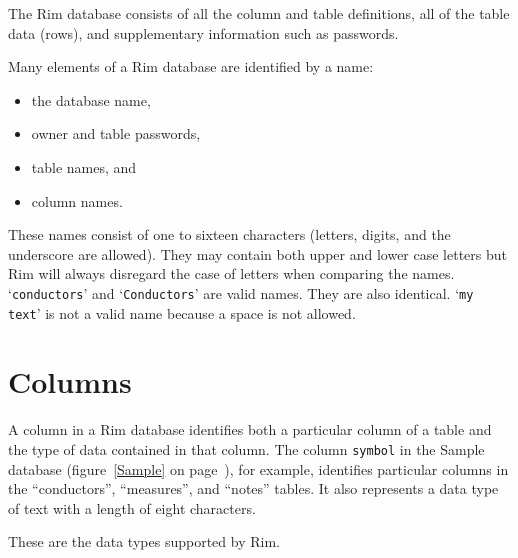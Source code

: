 \documentclass[11pt,a4paper]{report}
\def\I{\index}
\begin{document}
 
The Rim database consists of all the column and table
definitions, all of the table data (rows),
and supplementary information such as passwords.
 
\I{Rim name}
Many elements of a Rim database are identified by a name:
\begin{itemize}
  \item  the database name,
  \item  owner and table passwords,
  \item  table names, and
  \item column names.
\end{itemize}
These names consist of one to sixteen
characters (letters, digits, and the underscore are allowed).
They may contain both upper and lower case letters but Rim
will always disregard the case of letters when comparing the names.
`\verb|conductors|' and `\verb|Conductors|' are valid names.  They are also
identical.  `\verb!my text!' is not a valid name because
a space is not allowed.
 
\section{Columns}
\I{column}
A column in a Rim database identifies both a particular
column of a table and the type of data contained in that
column.  The column \verb!symbol! in the Sample database
(figure~\ref{Sample} on page~\pageref{Sample}),
for example, identifies particular
columns in the ``conductors'', ``measures'', and ``notes'' tables.
It also represents a data type of text with a length of
eight characters.
 
These are the data types supported by Rim.
 
\end{document}

